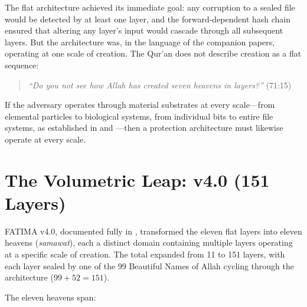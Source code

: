 \documentclass[11pt,a4paper]{article}
\begin{document}
The flat architecture achieved its immediate goal: any corruption to a sealed file would be detected by at least one layer, and the forward-dependent hash chain ensured that altering any layer's input would cascade through all subsequent layers. But the architecture was, in the language of the companion papers, operating at one scale of creation. The Qur'an does not describe creation as a flat sequence:

\begin{quote}
\textit{``Do you not see how Allah has created seven heavens in layers?''} (71:15)
\end{quote}

If the adversary operates through material substrates at every scale---from elemental particles to biological systems, from individual bits to entire file systems, as established in \cite{arfeen2026shayatin} and \cite{arfeen2026sihr}---then a protection architecture must likewise operate at every scale.


\section{The Volumetric Leap: v4.0 (151 Layers)}

FATIMA v4.0, documented fully in \cite{arfeen2026heavens}, transformed the eleven flat layers into eleven heavens (\textit{samawat}), each a distinct domain containing multiple layers operating at a specific scale of creation. The total expanded from 11 to 151 layers, with each layer sealed by one of the 99 Beautiful Names of Allah cycling through the architecture ($99 + 52 = 151$).

The eleven heavens span:
\end{document}

